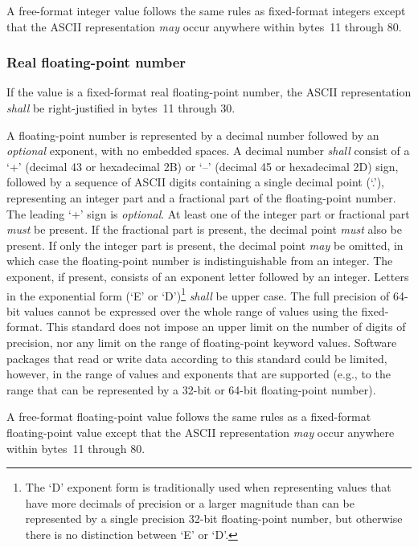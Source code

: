 \documentclass[onecolumn]{aa}
\begin{document}
   A free-format integer value follows the same rules as fixed-format integers
   except that the ASCII representation {\em may} occur anywhere within 
   bytes~11 through 80.
   
   \subsubsection{Real floating-point number}
   \label{s:ffrfp}
   If the value is a fixed-format real floating-point number, 
   the ASCII
   representation {\em shall} be right-justified in bytes~11 through 30.

   A floating-point number is represented by 
   a decimal number followed by an {\em optional} exponent, with no embedded spaces.  
   A decimal number {\em shall} consist of a `+' (decimal 43 or hexadecimal 2B) or `--'
   (decimal 45 or hexadecimal 2D) sign, followed by a sequence of ASCII digits
   containing a single decimal point (`.'), representing an integer part
   and a fractional part of the floating-point number.  The leading `+'
   sign is {\em optional}.
   At least one of the integer part or fractional part {\em must} be present.  If
   the fractional part is present, the decimal point {\em must} also be present.
   If only the integer part is present, the decimal point {\em may} be omitted,
   in which case the floating-point number is indistinguishable from an integer.
   The exponent, if present, consists of an exponent letter
   followed by an integer. 
   Letters in the exponential form (`E' or `D')\footnote{The `D' exponent
   form is traditionally used when representing values that have more decimals 
   of precision or a larger magnitude than can be represented by a 
   single precision 32-bit floating-point number, but otherwise there
   is no distinction between `E' or `D'.} 
   {\em shall} be upper case.
   The full precision of 64-bit values cannot
   be expressed over the whole range of values using the fixed-format. 
This standard does not impose an upper limit on the number of 
digits of precision, nor any limit on the range of floating-point keyword 
values.  Software packages that read or write 
data according to this standard could be limited, however, in the range of 
values and exponents that are supported (e.g., to the range that 
can be represented by a 32-bit or 64-bit floating-point number).
  
   A free-format floating-point value follows the same rules as a fixed-format 
   floating-point value except that the ASCII representation {\em may} occur 
   anywhere within bytes~11 through 80.
\end{document}
